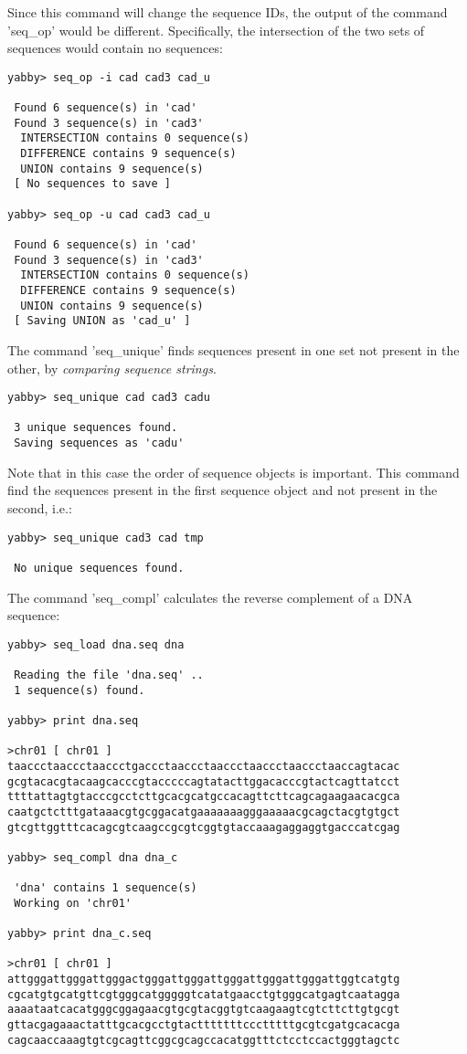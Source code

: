 Since this command will change the sequence IDs, the output
of the command 'seq\_op' would be different. Specifically,
the intersection of the two sets of sequences would contain
no sequences:

\begin{verbatim}
yabby> seq_op -i cad cad3 cad_u

 Found 6 sequence(s) in 'cad'
 Found 3 sequence(s) in 'cad3'
  INTERSECTION contains 0 sequence(s)
  DIFFERENCE contains 9 sequence(s)
  UNION contains 9 sequence(s)
 [ No sequences to save ]

yabby> seq_op -u cad cad3 cad_u

 Found 6 sequence(s) in 'cad'
 Found 3 sequence(s) in 'cad3'
  INTERSECTION contains 0 sequence(s)
  DIFFERENCE contains 9 sequence(s)
  UNION contains 9 sequence(s)
 [ Saving UNION as 'cad_u' ]
\end{verbatim}


The command 'seq\_unique' finds sequences present in one set
not present in the other, by {\em comparing sequence strings}.

\begin{verbatim}
yabby> seq_unique cad cad3 cadu

 3 unique sequences found.
 Saving sequences as 'cadu'
\end{verbatim}

Note that in this case the order of sequence objects is important.
This command find the sequences present in the first sequence
object and not present in the second, i.e.:

\begin{verbatim}
yabby> seq_unique cad3 cad tmp

 No unique sequences found.
\end{verbatim}

The command 'seq\_compl' calculates the reverse complement of
a DNA sequence:

\begin{verbatim}
yabby> seq_load dna.seq dna

 Reading the file 'dna.seq' ..
 1 sequence(s) found.

yabby> print dna.seq

>chr01 [ chr01 ]
taaccctaaccctaaccctgaccctaaccctaaccctaaccctaaccctaaccagtacac
gcgtacacgtacaagcacccgtacccccagtatacttggacacccgtactcagttatcct
ttttattagtgtacccgcctcttgcacgcatgccacagttcttcagcagaagaacacgca
caatgctctttgataaacgtgcggacatgaaaaaaagggaaaaacgcagctacgtgtgct
gtcgttggtttcacagcgtcaagccgcgtcggtgtaccaaagaggaggtgacccatcgag

yabby> seq_compl dna dna_c

 'dna' contains 1 sequence(s)
 Working on 'chr01'

yabby> print dna_c.seq

>chr01 [ chr01 ]
attgggattgggattgggactgggattgggattgggattgggattgggattggtcatgtg
cgcatgtgcatgttcgtgggcatgggggtcatatgaacctgtgggcatgagtcaatagga
aaaataatcacatgggcggagaacgtgcgtacggtgtcaagaagtcgtcttcttgtgcgt
gttacgagaaactatttgcacgcctgtactttttttccctttttgcgtcgatgcacacga
cagcaaccaaagtgtcgcagttcggcgcagccacatggtttctcctccactgggtagctc
\end{verbatim}

